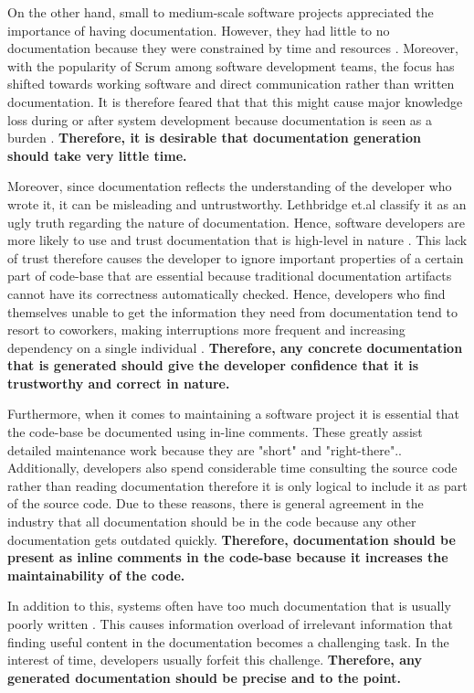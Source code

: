 On the other hand, small to medium-scale software projects appreciated the importance of having documentation. However, they had little to no documentation because they were constrained by time and resources \cite{Forward:2002}. Moreover, with the popularity of Scrum among software development teams, the focus has shifted towards working software and direct communication rather than written documentation. It is therefore feared that that this might cause major knowledge loss during or after system development because documentation is seen as a burden \cite{Stettina:2011}.  \textbf{Therefore, it is desirable that documentation generation should take very little time.}

Moreover, since documentation reflects the understanding of the developer who wrote it, it can be misleading and untrustworthy. Lethbridge et.al classify it as an ugly truth regarding the nature of documentation. Hence, software developers are more likely to use and trust documentation that is high-level in nature   \cite{Lethbridge:2003}. This lack of trust therefore causes the developer to ignore important properties of a certain part of code-base that are essential because traditional documentation artifacts cannot have its correctness automatically checked. Hence, developers who find themselves unable to get the information they need from documentation tend to resort to coworkers, making interruptions more frequent and increasing dependency on a single individual \cite{Ko:2007}. \textbf{Therefore, any concrete documentation that is generated should give the developer confidence that it is trustworthy and correct in nature.}

Furthermore, when it comes to maintaining a software project it is essential that the code-base be documented using in-line comments. These greatly assist detailed maintenance work because they are "short" and "right-there".\cite{Lethbridge:2003}. Additionally, developers also spend considerable time consulting the source code rather than reading documentation \cite{Lethbridge:2003} therefore it is only logical to include it as part of the source code.
Due to these reasons, there is general agreement in the industry that all documentation should be in the code because any other documentation gets outdated quickly. \cite{kull_2015} \textbf{Therefore, documentation should be present as inline comments in the code-base because it increases the maintainability of the code.}

In addition to this, systems often have too much documentation that is usually poorly written \cite{Lethbridge:2003}. This causes information overload of irrelevant information that finding useful content in the documentation becomes a challenging task. In the interest of time, developers usually forfeit this challenge. \textbf{Therefore, any generated documentation should be precise and to the point.}

